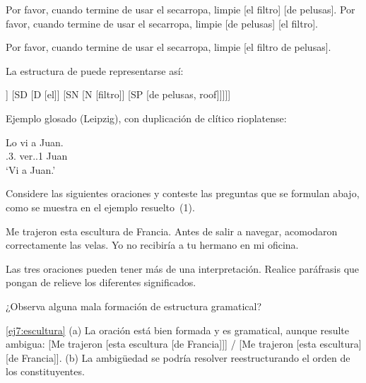 \begin{exe}
  \ex\label{ex:lectura1}
    \begin{xlist}
      \ex Por favor, cuando termine de usar el secarropa, limpie [el filtro] [de pelusas].
      \ex Por favor, cuando termine de usar el secarropa, limpie [de pelusas] [el filtro].
    \end{xlist}
  \ex\label{ex:lectura2}
    \begin{xlist}
      \ex Por favor, cuando termine de usar el secarropa, limpie [el filtro de pelusas].
    \end{xlist}
\end{exe}

La estructura de  puede representarse así:

\begin{arbol}
  [SV [V [limpie]] [SD [D [el]] [SN [N [filtro]] [SP [de pelusas, roof]]]]]
\end{arbol}

Ejemplo glosado (Leipzig), con duplicación de clítico rioplatense:

\begin{exe}
  \ex\label{ex:glosa}
    \gll Lo vi a Juan.\\
         \Acc.3\Sg.\M{} ver.\Pst.1\Sg{} \Dom{} Juan\\
    \glt ‘Vi a Juan.’
\end{exe}

\begin{ejercicio}[Ambigüedad]
Considere las siguientes oraciones y conteste las preguntas que se formulan
abajo, como se muestra en el ejemplo resuelto~(1).

\begin{exe}
  \ex\label{ej7:escultura} Me trajeron esta escultura de Francia.
  \ex Antes de salir a navegar, acomodaron correctamente las velas.
  \ex Yo no recibiría a tu hermano en mi oficina.
\end{exe}

\begin{consignas}
  \item Las tres oraciones pueden tener más de una interpretación. Realice
        paráfrasis que pongan de relieve los diferentes significados.
  \item ¿Observa alguna mala formación de estructura gramatical?
\end{consignas}

\begin{resuelto}
\ref{ej7:escultura} (a) La oración está bien formada y es gramatical, aunque
resulte ambigua: [Me trajeron [esta escultura [de Francia]]] / [Me trajeron
[esta escultura] [de Francia]]. (b) La ambigüedad se podría resolver
reestructurando el orden de los constituyentes.
\end{resuelto}
\end{ejercicio}

